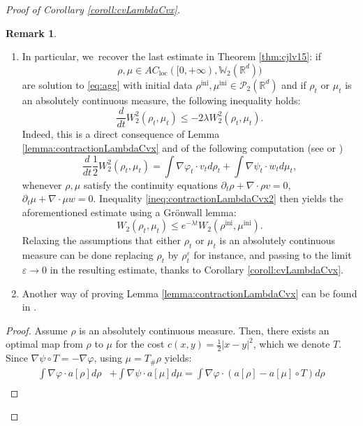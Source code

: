 \documentclass[11pt]{article}
\newcommand{\skpt}{\smallskip}
\numberwithin{equation}{section}
\newcommand{\ini}{\mathrm{ini}}
\def\RR{\mathbb{R}}
\def\WW{\mathbb{W}}
\def\eps{\varepsilon}
\def\pa{\partial}
\def\calP{{\mathcal P}}
\theoremstyle{plain}
\theoremstyle{definition}
\newtheorem{remark}[theorem]{Remark}
\begin{document}
\begin{proof}[Proof of Corollary \ref{coroll:cvLambdaCvx}]
\skpt
\begin{remark}
\begin{enumerate}
\item In particular, we~recover the last estimate in Theorem \ref{thm:cjlv15}: if
\[
\rho, \mu \in AC_\mathrm{loc}([0,+\infty), \WW _2(\RR^d))
\]
are solution to \eqref{eq:agg} with initial data $\rho^{\ini}, \mu^{\ini} \in \calP_2(\RR^d)$ and if $\rho_t$ or $\mu_t$ is an absolutely continuous measure, the following inequality holds:
\begin{equation}\label{ineq:contractionLambdaCvx2}
\frac{d}{dt} W_2^2(\rho_t, \mu_t) \leq -2\lambda W_2^2(\rho_t, \mu_t).
\end{equation}
Indeed, this is a direct consequence of Lemma \ref{lemma:contractionLambdaCvx} and of the following computation (see \cite[Th.\,5.25]{otam15} or \cite[Th.\,8.4.7]{ambrosio08})
\begin{equation}\label{eq:derW2}
\frac{d}{dt} \frac 12 W_2^2(\rho_t, \mu_t) = \int \nabla \varphi_t \cdot v_t d\rho_t + \int \nabla \psi_t \cdot w_t d\mu_t,
\end{equation}
whenever $\rho, \mu$ satisfy the continuity equations $\pa_t \rho + \nabla \cdot \rho v = 0$, $\pa_t \mu + \nabla \cdot \mu w = 0$. Inequality \eqref{ineq:contractionLambdaCvx2} then yields the aforementioned estimate using a Grönwall lemma:
\begin{equation}
W_2(\rho_t, \mu_t) \leq e^{-\lambda t} W_2(\rho^{\ini}, \mu^{\ini}).
\end{equation}
Relaxing the assumptions that either $\rho_t$ or $\mu_t$ is an absolutely continuous measure can be done replacing $\rho_t$ by $\rho^\eps_t$ for instance, and passing to the limit $\eps \to 0$ in the resulting estimate, thanks to Corollary \ref{coroll:cvLambdaCvx}.
\item Another way of proving Lemma \ref{lemma:contractionLambdaCvx} can be found in \cite[Lem.\,4.12]{santambrogio_bourbaki}.
\end{enumerate}
\end{remark}
\begin{proof}
Assume $\rho$ is an absolutely continuous measure. Then, there exists an optimal map from $\rho$ to $\mu$ for the cost $c(x,y) = \frac 12 |x-y|^2$, which we denote $T$. Since $\nabla \psi \circ T = - \nabla \varphi$, using $\mu = T_\# \rho$ yields:
\begin{align*}
\int \nabla \varphi \cdot a[\rho] d\rho & + \int \nabla \psi \cdot a[\mu] d\mu = \int \nabla \varphi \cdot (a[\rho] - a[\mu] \circ T) d\rho \\

\end{align*}
\end{proof}
\end{proof}
\end{document}
